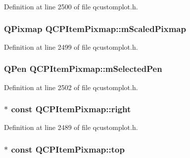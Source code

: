 Definition at line 2500 of file qcustomplot.\-h.

\hypertarget{class_q_c_p_item_pixmap_a2ebc66e15b9f1264563d58f29ba1bc00}{
\subsubsection[{m\-Scaled\-Pixmap}]{\setlength{\rightskip}{0pt plus 5cm}Q\-Pixmap Q\-C\-P\-Item\-Pixmap\-::m\-Scaled\-Pixmap\hspace{0.3cm}{\ttfamily [protected]}}}\label{class_q_c_p_item_pixmap_a2ebc66e15b9f1264563d58f29ba1bc00}


Definition at line 2499 of file qcustomplot.\-h.

\hypertarget{class_q_c_p_item_pixmap_a0949e5bb6a261fc4e9668e28e2effcfa}{
\subsubsection[{m\-Selected\-Pen}]{\setlength{\rightskip}{0pt plus 5cm}Q\-Pen Q\-C\-P\-Item\-Pixmap\-::m\-Selected\-Pen\hspace{0.3cm}{\ttfamily [protected]}}}\label{class_q_c_p_item_pixmap_a0949e5bb6a261fc4e9668e28e2effcfa}


Definition at line 2502 of file qcustomplot.\-h.

\hypertarget{class_q_c_p_item_pixmap_ac9c0fd231f9e285765978a05d13f8280}{
\subsubsection[{right}]{$\ast$ const Q\-C\-P\-Item\-Pixmap\-::right}}\label{class_q_c_p_item_pixmap_ac9c0fd231f9e285765978a05d13f8280}


Definition at line 2489 of file qcustomplot.\-h.

\hypertarget{class_q_c_p_item_pixmap_af7a156590b1d59ab21b453c430c56a7c}{
\subsubsection[{top}]{$\ast$ const Q\-C\-P\-Item\-Pixmap\-::top}}\label{class_q_c_p_item_pixmap_af7a156590b1d59ab21b453c430c56a7c}


